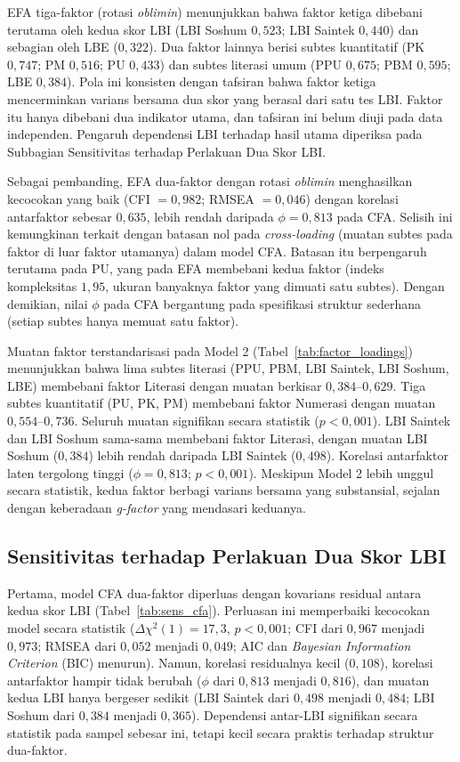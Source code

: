 EFA tiga-faktor (rotasi \textit{oblimin}) menunjukkan bahwa faktor ketiga dibebani terutama oleh kedua skor LBI (LBI Soshum $0,523$; LBI Saintek $0,440$) dan sebagian oleh LBE ($0,322$). Dua faktor lainnya berisi subtes kuantitatif (PK $0,747$; PM $0,516$; PU $0,433$) dan subtes literasi umum (PPU $0,675$; PBM $0,595$; LBE $0,384$). Pola ini konsisten dengan tafsiran bahwa faktor ketiga mencerminkan varians bersama dua skor yang berasal dari satu tes LBI. Faktor itu hanya dibebani dua indikator utama, dan tafsiran ini belum diuji pada data independen. Pengaruh dependensi LBI terhadap hasil utama diperiksa pada Subbagian Sensitivitas terhadap Perlakuan Dua Skor LBI.

Sebagai pembanding, EFA dua-faktor dengan rotasi \textit{oblimin} menghasilkan kecocokan yang baik (CFI $= 0,982$; RMSEA $= 0,046$) dengan korelasi antarfaktor sebesar $0,635$, lebih rendah daripada $\phi = 0,813$ pada CFA. Selisih ini kemungkinan terkait dengan batasan nol pada \textit{cross-loading} (muatan subtes pada faktor di luar faktor utamanya) dalam model CFA. Batasan itu berpengaruh terutama pada PU, yang pada EFA membebani kedua faktor (indeks kompleksitas $1,95$, ukuran banyaknya faktor yang dimuati satu subtes). Dengan demikian, nilai $\phi$ pada CFA bergantung pada spesifikasi struktur sederhana (setiap subtes hanya memuat satu faktor).

Muatan faktor terstandarisasi pada Model 2 (Tabel~\ref{tab:factor_loadings}) menunjukkan bahwa lima subtes literasi (PPU, PBM, LBI Saintek, LBI Soshum, LBE) membebani faktor Literasi dengan muatan berkisar $0,384$--$0,629$. Tiga subtes kuantitatif (PU, PK, PM) membebani faktor Numerasi dengan muatan $0,554$--$0,736$. Seluruh muatan signifikan secara statistik ($p < 0,001$). LBI Saintek dan LBI Soshum sama-sama membebani faktor Literasi, dengan muatan LBI Soshum ($0,384$) lebih rendah daripada LBI Saintek ($0,498$). Korelasi antarfaktor laten tergolong tinggi ($\phi = 0,813$; $p < 0,001$). Meskipun Model 2 lebih unggul secara statistik, kedua faktor berbagi varians bersama yang substansial, sejalan dengan keberadaan \textit{g-factor} yang mendasari keduanya.



\subsection{Sensitivitas terhadap Perlakuan Dua Skor LBI}
Pertama, model CFA dua-faktor diperluas dengan kovarians residual antara kedua skor LBI (Tabel~\ref{tab:sens_cfa}). Perluasan ini memperbaiki kecocokan model secara statistik ($\Delta\chi^2(1) = 17,3$, $p < 0,001$; CFI dari $0,967$ menjadi $0,973$; RMSEA dari $0,052$ menjadi $0,049$; AIC dan \textit{Bayesian Information Criterion} (BIC) menurun). Namun, korelasi residualnya kecil ($0,108$), korelasi antarfaktor hampir tidak berubah ($\phi$ dari $0,813$ menjadi $0,816$), dan muatan kedua LBI hanya bergeser sedikit (LBI Saintek dari $0,498$ menjadi $0,484$; LBI Soshum dari $0,384$ menjadi $0,365$). Dependensi antar-LBI signifikan secara statistik pada sampel sebesar ini, tetapi kecil secara praktis terhadap struktur dua-faktor.

